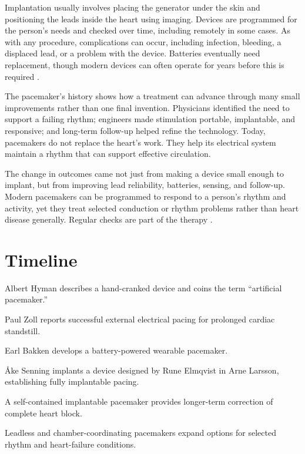 \documentclass[12pt,oneside]{book}
\begin{document}
Implantation usually involves placing the generator under the skin and
positioning the leads inside the heart using imaging. Devices are
programmed for the person's needs and checked over time, including
remotely in some cases. As with any procedure, complications can occur,
including infection, bleeding, a displaced lead, or a problem with the
device. Batteries eventually need replacement, though modern devices can
often operate for years before this is required
\cite{nhlbiPacemakerHowItWorks,nhlbiPacemakerAfter}.

The pacemaker's history shows how a treatment can advance through many
small improvements rather than one final invention. Physicians identified
the need to support a failing rhythm; engineers made stimulation portable,
implantable, and responsive; and long-term follow-up helped refine the
technology. Today, pacemakers do not replace the heart's work. They help
its electrical system maintain a rhythm that can support effective
circulation.

The change in outcomes came not just from making a device small enough to
implant, but from improving lead reliability, batteries, sensing, and
follow-up. Modern pacemakers can be programmed to respond to a person’s rhythm
and activity, yet they treat selected conduction or rhythm problems rather
than heart disease generally. Regular checks are part of the therapy
\cite{nhlbiPacemakerNeeds,nhlbiPacemakerAfter}.

\section*{Timeline}
\begin{description}[leftmargin=2.3cm,style=nextline]
  \item[1932] Albert Hyman describes a hand-cranked device and coins the term ``artificial pacemaker.''
  \item[1952] Paul Zoll reports successful external electrical pacing for prolonged cardiac standstill.
  \item[1957] Earl Bakken develops a battery-powered wearable pacemaker.
  \item[1958] Åke Senning implants a device designed by Rune Elmqvist in Arne Larsson, establishing fully implantable pacing.
  \item[1960] A self-contained implantable pacemaker provides longer-term correction of complete heart block.
  \item[Today] Leadless and chamber-coordinating pacemakers expand options for selected rhythm and heart-failure conditions.
\end{description}
\end{document}

